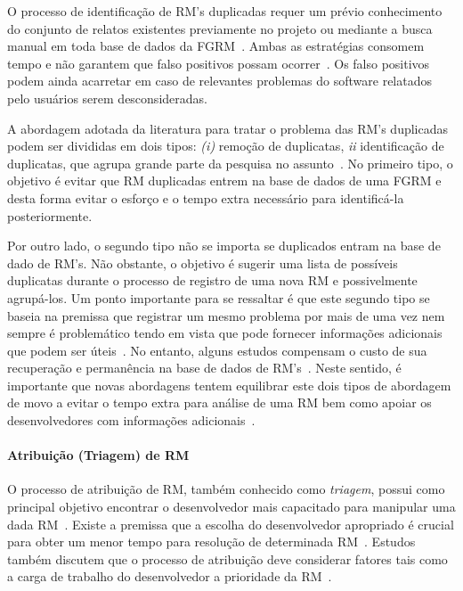 O processo de identificação de RM's duplicadas requer um prévio conhecimento do
conjunto de relatos existentes previamente no projeto ou mediante a busca manual
em toda base de dados da FGRM~\cite{banerjee2012automated,
	Lerch:2013:FDY:2495256.2495763,hindle2016contextual}. Ambas as estratégias
consomem tempo e não garantem que falso positivos possam
ocorrer~\cite{kaushik2012comparative}. Os falso positivos podem ainda acarretar
em caso de relevantes problemas do software relatados pelo usuários serem
desconsideradas.

A abordagem adotada da literatura para tratar o problema das RM's duplicadas
podem ser divididas em dois tipos\cite{kaushik2012comparative,
	tian2012improved}: \textit{(i)} remoção de duplicatas, \textit{ii}
identificação de duplicatas, que agrupa grande parte da pesquisa no
assunto~\cite{cavalcanti2014challenges}. No primeiro tipo, o objetivo é evitar
que RM duplicadas entrem na base de dados de uma FGRM e desta forma evitar o
esforço e o tempo extra necessário para identificá-la posteriormente.

Por outro lado, o segundo tipo não se importa se duplicados entram na base de
dado de RM's. Não obstante, o objetivo é sugerir uma lista de possíveis
duplicatas durante o processo de registro de uma nova RM e possivelmente
agrupá-los. Um ponto importante para se ressaltar é que este segundo tipo se
baseia na premissa que registrar um mesmo problema por mais de uma vez nem
sempre é problemático tendo em vista que pode fornecer informações adicionais
que podem ser úteis~\cite{bettenburg2008duplicate}. No entanto, alguns estudos
compensam o custo de sua recuperação e permanência na base de dados de
RM's~\cite{davidson2011coping}. Neste sentido, é importante que novas abordagens
tentem equilibrar este dois tipos de abordagem de movo a evitar o tempo extra
para análise de uma RM bem como apoiar os desenvolvedores com informações
adicionais~\cite{Lerch:2013:FDY:2495256.2495763,Thung2014}.

\paragraph{Atribuição (Triagem) de RM} O processo de atribuição de RM, também
conhecido como \textit{triagem}, possui como principal objetivo encontrar o
desenvolvedor mais capacitado para manipular uma dada
RM~\cite{cavalcanti2014challenges}. Existe a premissa que a escolha do
desenvolvedor apropriado é crucial para obter um menor tempo para resolução de
determinada RM~\cite{di2002approach}. Estudos também discutem que o processo de
atribuição deve considerar fatores tais como a carga de trabalho do
desenvolvedor a prioridade da RM~\cite{aljarah2011selecting}.


